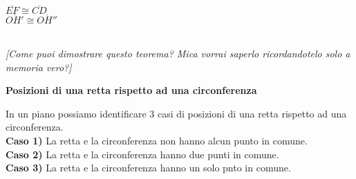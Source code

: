 \documentclass[14pt]{extarticle}
\begin{document}
\begin{itemize}
\begin{minipage}[c]{0.3\textwidth}
\end{minipage}
\begin{minipage}[c]{0.7\textwidth}
\(\overline{EF}\cong\overline{CD}\)\\     
\(\overline{OH'}\cong\overline{OH''}\)
\end{minipage}\\

\small{\textit{[Come puoi dimostrare questo teorema? Mica vorrai saperlo ricordandotelo solo a memoria vero?]}}\\
\clearpage
\begin{center}
    \large{\textbf{Posizioni di una retta rispetto ad una circonferenza}}\\
\end{center}
In un piano possiamo identificare 3 casi di posizioni di una retta rispetto ad una circonferenza.\\

\textbf{Caso 1)} La retta e la circonferenza non hanno alcun punto in comune.\\

\textbf{Caso 2)} La retta e la circonferenza hanno due punti in comune.\\

\textbf{Caso 3)} La retta e la circonferenza hanno un solo pnto in comune.\\


\end{itemize}
\end{document}
